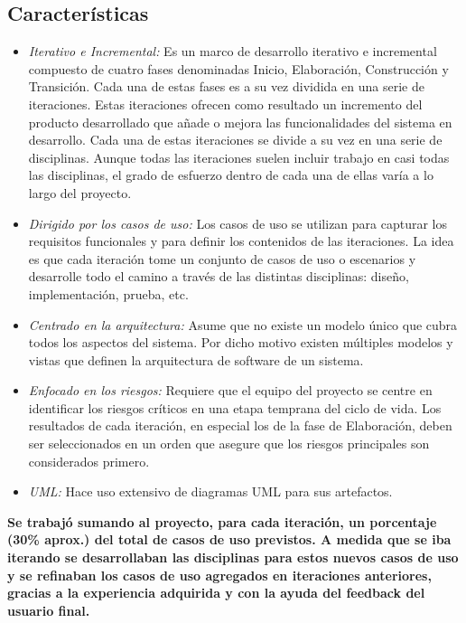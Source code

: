 \subsection{Características}
    
\begin{itemize}
    \item \emph{Iterativo e Incremental:} Es un marco de desarrollo iterativo e incremental compuesto de cuatro fases denominadas Inicio, Elaboración, Construcción y Transición. Cada una de estas fases es a su vez dividida en una serie de iteraciones. Estas iteraciones ofrecen como resultado un incremento del producto desarrollado que añade o mejora las funcionalidades del sistema en desarrollo. Cada una de estas iteraciones se divide a su vez en una serie de disciplinas. Aunque todas las iteraciones suelen incluir trabajo en casi todas las disciplinas, el grado de esfuerzo dentro de cada una de ellas varía a lo largo del proyecto.
    \item \emph{Dirigido por los casos de uso:} Los casos de uso se utilizan para capturar los requisitos funcionales y para definir los contenidos de las iteraciones. La idea es que cada iteración tome un conjunto de casos de uso o escenarios y desarrolle todo el camino a través de las distintas disciplinas: diseño, implementación, prueba, etc.
    \item \emph{Centrado en la arquitectura:} Asume que no existe un modelo único que cubra todos los aspectos del sistema. Por dicho motivo existen múltiples modelos y vistas que definen la arquitectura de software de un sistema.
    \item \emph{Enfocado en los riesgos:} Requiere que el equipo del proyecto se centre en identificar los riesgos críticos en una etapa temprana del ciclo de vida. Los resultados de cada iteración, en especial los de la fase de Elaboración, deben ser seleccionados en un orden que asegure que los riesgos principales son considerados primero.
    \item \emph{UML:} Hace uso extensivo de diagramas UML para sus artefactos.
\end{itemize}

\textbf{Se trabajó sumando al proyecto, para cada iteración, un porcentaje (30\% aprox.) del total de casos de uso previstos.  A medida que se iba iterando se desarrollaban las disciplinas para estos nuevos casos de uso y se refinaban los casos de uso agregados en iteraciones anteriores, gracias a la experiencia adquirida y con la ayuda del feedback del usuario final.}



